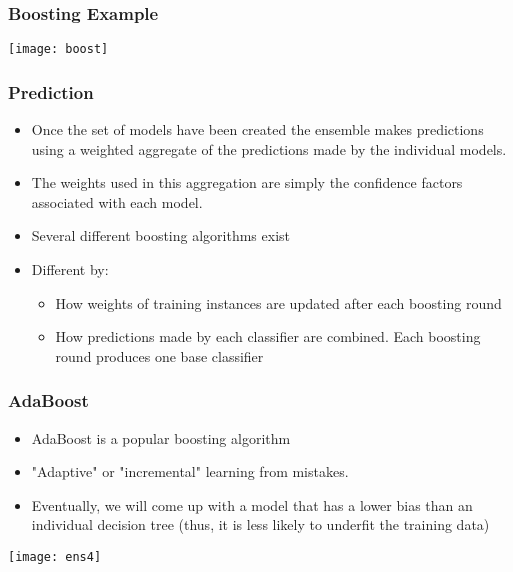 \begin{frame}[fragile]\frametitle{Boosting Example}
\begin{center}
\texttt{[image: boost]}
\end{center}

\end{frame}

\begin{frame}[fragile]\frametitle{Prediction}
\begin{itemize}
\item Once the set of models have been created the ensemble makes predictions using a weighted aggregate of the predictions made by the individual models. 
\item The weights used in this aggregation are simply the confidence factors associated with each model. 
\item Several different boosting algorithms exist
\item Different by:
\begin{itemize}
\item How weights of training instances are updated after each boosting round
\item How predictions made by each classifier are combined. Each boosting round produces one base classifier
\end{itemize}
\end{itemize}
\end{frame}

\begin{frame}[fragile]\frametitle{AdaBoost}
\begin{itemize}
\item AdaBoost is a popular boosting algorithm
\item "Adaptive" or "incremental" learning from mistakes.
\item Eventually, we will come up with a model that has a lower bias than an individual decision tree (thus, it is less likely to underfit the training data)
\end{itemize}
\begin{center}
\texttt{[image: ens4]}
\end{center}

\end{frame}



